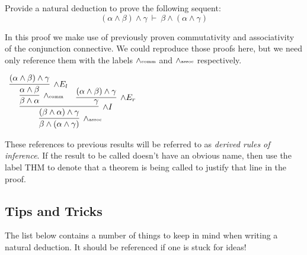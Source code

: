 \documentclass{book}
\begin{document}
    \begin{eg}

        Provide a natural deduction to prove the following sequent: $$(\alpha \land \beta) \land \gamma \ \vdash \ \beta \land (\alpha \land \gamma)$$

        In this proof we make use of previously proven commutativity and associativity of the conjunction connective. We could reproduce those proofs here, but we need only reference them with the labels $\land \textnormal{\tiny{comm}}$ and $\land \textnormal{\tiny{assoc}}$ respectively. 

        \begin{center}
            $\begin{array}{c}
                \infer[\land \textnormal{\tiny{assoc}}]{\beta \land (\alpha \land \gamma)}
                    {\infer[\land I]{(\beta \land \alpha) \land \gamma}
                        {\infer[\land \textnormal{\tiny{comm}}]{\beta \land \alpha}
                            {\infer[\land E_{l}]{\alpha \land \beta}
                                {(\alpha \land \beta) \land \gamma}}
                        &
                        \infer[\land E_{r}]{\gamma}
                            {(\alpha \land \beta) \land \gamma}}}
            \end{array}$
        \end{center}
        
    \end{eg}

    These references to previous results will be referred to as \emph{derived rules of inference}. If the result to be called doesn't have an obvious name, then use the label THM to denote that a theorem is being called to justify that line in the proof. 


    \newpage
    \subsection*{Tips and Tricks}
    
    The list below contains a number of things to keep in mind when writing a natural deduction. It should be referenced if one is stuck for ideas! 
\end{document}
